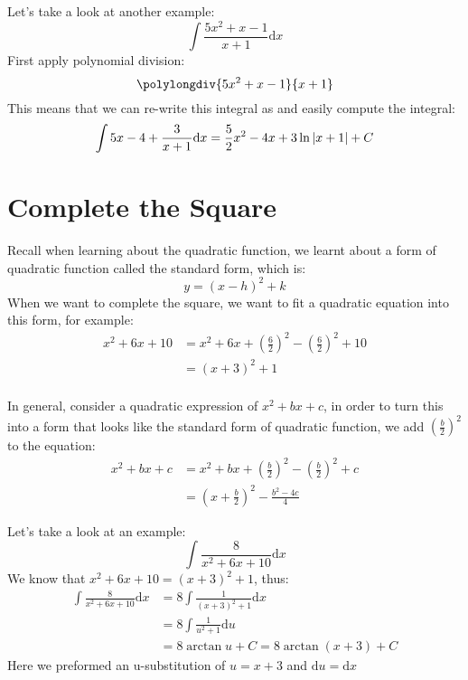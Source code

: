 \documentclass{article}
\numberwithin{equation}{section}
\begin{document}
Let's take a look at another example:
\[
\int \frac{5x^2 + x - 1}{x + 1}\mathrm{d}x
\]
First apply polynomial division:
\[
    \polylongdiv{5x^2 + x - 1}{x + 1}
\]
This means that we can re-write this integral as and easily compute the integral:
\[
\int 5x - 4 + \frac{3}{x+1} \mathrm{d}x = \frac{5}{2}x^2 - 4x + 3\ln\abs{x+1} + C
\]

\section{Complete the Square}
Recall when learning about the quadratic function, we learnt about a form of quadratic function called
the standard form, which is:
\[
y = (x-h)^2 + k
\]
When we want to complete the square, we want to fit a quadratic equation into this form, for example:
\begin{align*}
    x^2 + 6x + 10 &= x^2 + 6x + \left(\frac{6}{2}\right)^2 - \left(\frac{6}{2}\right)^2 + 10\\
    &= (x+3)^2 + 1\\
\end{align*}

In general, consider a quadratic expression of $x^2 + bx + c$, in order to turn this into a form
that looks like the standard form of quadratic function, we add $\displaystyle \left(\frac{b}{2}\right)^2$ to the equation:
\begin{align*}
    x^2 + bx + c &= x^2 + bx + \left(\frac{b}{2}\right)^2 - \left(\frac{b}{2}\right)^2 + c\\
    &= \left(x+ \frac{b}{2}\right)^2 - \frac{b^2-4c}{4}
\end{align*}

Let's take a look at an example:
\[
\int \frac{8}{x^2 + 6x + 10}\mathrm{d}x
\]
We know that $x^2 + 6x + 10 = (x+3)^2 +1$, thus:
\begin{align*}
    \int \frac{8}{x^2 + 6x + 10}\mathrm{d}x &= 8\int \frac{1}{(x+3)^2 + 1}\mathrm{d}x\\
    &= 8 \int \frac{1}{u^2 + 1}\mathrm{d}u\\
    &= 8\arctan{u}+C = 8 \arctan{(x+3)}+C
\end{align*}
Here we preformed an u-substitution of $u = x+3$ and $\mathrm{d}u = \mathrm{d}x$ 
\end{document}
